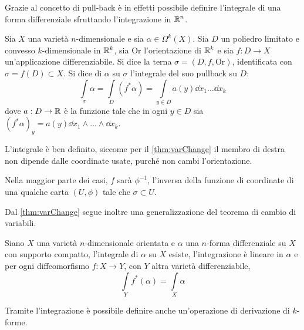 Grazie al concetto di pull-back è in effetti possibile definire l'integrale di una forma differenziale sfruttando l'integrazione in $\mathbb{R}^{n}$.
\begin{definition}
  Sia $X$ una varietà $n$-dimensionale e sia $\alpha \in \Omega^k(X)$. Sia $D$ un poliedro limitato e convesso $k$-dimensionale in $\mathbb{R}^{k}$, sia $\mathrm{Or}$ l'orientazione di $\mathbb{R}^k$ e sia $f:D\to X$ un'applicazione differenziabile. Si dice  la terna $\sigma = (D,f,\mathrm{Or})$, identificata con $\sigma = f(D) \subset X$. Si dice  di $\alpha$ su $\sigma$ l'integrale del suo pullback su $D$: \begin{equation*}
  \int\limits_{\sigma} \alpha = \int\limits_{D} (f^* \alpha) = \int\limits_{y \in D} a(y) \dd{x_1} \ldots \dd{x_k}
  \end{equation*}
  dove $a: D \to \mathbb{R}$ è la funzione tale che in ogni $y \in D$ sia $(f^* \alpha)_y = a(y) \dd{x_1} \wedge \ldots \wedge \dd{x_k}$.
\end{definition}
\begin{remark}
  L'integrale è ben definito, siccome per il \autoref{thm:varChange} il membro di destra non dipende dalle coordinate usate, purché non cambi l'orientazione.
\end{remark}
\begin{remark}
  Nella maggior parte dei casi, $f$ sarà $\phi^{-1}$, l'inversa della funzione di coordinate di una qualche carta $(U,\phi)$ tale che $\sigma \subset U$.
\end{remark}

Dal \autoref{thm:varChange} segue inoltre una generalizzazione del teorema di cambio di variabili.
\begin{theorem}
  Siano $X$ una varietà $n$-dimensionale orientata e $\alpha$ una $n$-forma differenziale su $X$ con supporto compatto, l'integrale di $\alpha$ su $X$ esiste, l'integrazione è lineare in $\alpha$ e per ogni diffeomorfismo $f:X\to Y$, con $Y$ altra varietà differenziabile,
  \begin{equation*}
  \int\limits_Y f^*(\alpha) = \int\limits_X \alpha
  \end{equation*} 
\end{theorem}

Tramite l'integrazione è possibile definire anche un'operazione di derivazione di $k$-forme.

